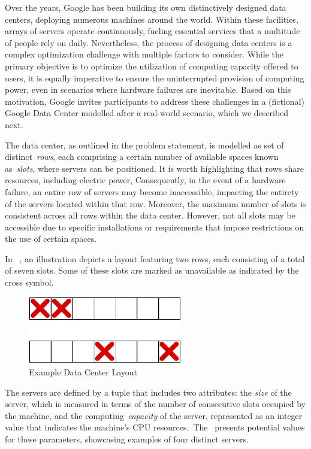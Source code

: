 Over the years, Google has been building its own distinctively designed data
centers, deploying numerous machines around the world. Within these facilities,
arrays of servers operate continuously, fueling essential services that a
multitude of people rely on daily. Nevertheless, the process of designing data
centers is a complex optimization challenge with multiple factors to consider.
While the primary objective is to optimize the utilization of computing capacity
offered to users, it is equally imperative to ensure the uninterrupted provision
of computing power, even in scenarios where hardware failures are inevitable.
Based on this motivation, Google invites participants to address these
challenges in a (fictional) Google Data Center modelled after a real-world
scenario, which we described next.

The data center, as outlined in the problem statement, is modelled as set of
distinct~\textit{rows}, each comprising a certain number of available spaces
known as~\textit{slots}, where servers can be positioned. It is worth
highlighting that rows share resources, including electric power, Consequently,
in the event of a hardware failure, an entire row of servers may become
inaccessible, impacting the entirety of the servers located within that row.
Moreover, the maximum number of slots is consistent across all rows within the
data center. However, not all slots may be accessible due to specific
installations or requirements that impose restrictions on the use of certain
spaces.

In ~, an illustration depicts a layout
featuring two rows, each consisting of a total of seven slots. Some of these
slots are marked as unavailable as indicated by the cross symbol.

\begin{figure}[h]
  \centering
  \includegraphics[width=0.6\textwidth,keepaspectratio]{../assets/dc/dc-rows-no-labels.pdf}
  \caption{Example Data Center Layout}
  \label{fig:data-center-layout}
\end{figure}

The servers are defined by a tuple that includes two attributes: the
\textit{size} of the server, which is measured in terms of the number of
consecutive slots occupied by the machine, and the computing~\textit{capacity}
of the server, represented as an integer value that indicates the machine's CPU
resources.~The~ presents potential values for
these parameters, showcasing examples of four distinct servers.

